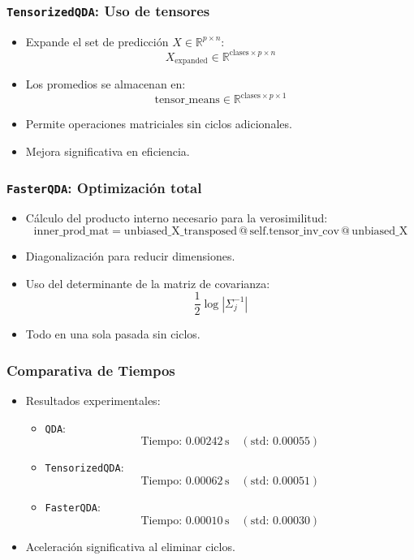 \documentclass{beamer}
\begin{document}
\begin{frame}
  \frametitle{\texttt{TensorizedQDA}: Uso de tensores}

  \begin{itemize}
    \item Expande el set de predicción \( X \in \mathbb{R}^{p \times n} \):
    \[
    X_{\text{expanded}} \in \mathbb{R}^{\text{clases} \times p \times n}
    \]
    \item Los promedios se almacenan en:
    \[
    \text{tensor\_means} \in \mathbb{R}^{\text{clases} \times p \times 1}
    \]
    \item Permite operaciones matriciales sin ciclos adicionales.
    \item Mejora significativa en eficiencia.
  \end{itemize}

\end{frame}

\begin{frame}
  \frametitle{\texttt{FasterQDA}: Optimización total}

  \begin{itemize}
    \item Cálculo del producto interno necesario para la verosimilitud:
    \[
    \text{inner\_prod\_mat} = \text{unbiased\_X\_transposed} \, @ \, \text{self.tensor\_inv\_cov} \, @ \, \text{unbiased\_X}
    \]
    \item Diagonalización para reducir dimensiones.
    \item Uso del determinante de la matriz de covarianza:
    \[
    \frac{1}{2} \log |\Sigma_j^{-1}|
    \]
    \item Todo en una sola pasada sin ciclos.
  \end{itemize}

\end{frame}

\begin{frame}
  \frametitle{Comparativa de Tiempos}

  \begin{itemize}
    \item Resultados experimentales:
    \begin{itemize}
      \item \texttt{QDA}: 
      \[
      \text{Tiempo: } 0.00242 \, \text{s} \quad (\text{std: } 0.00055)
      \]
      \item \texttt{TensorizedQDA}: 
      \[
      \text{Tiempo: } 0.00062 \, \text{s} \quad (\text{std: } 0.00051)
      \]
      \item \texttt{FasterQDA}: 
      \[
      \text{Tiempo: } 0.00010 \, \text{s} \quad (\text{std: } 0.00030)
      \]
    \end{itemize}
    \item Aceleración significativa al eliminar ciclos.
  \end{itemize}

\end{frame}
\end{document}
